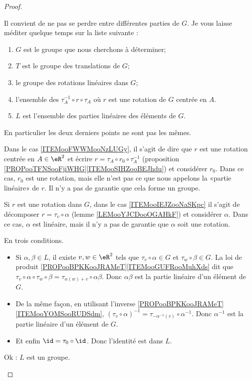 \begin{proof}
	\begin{subproof}
		Il convient de ne pas se perdre entre différentes parties de \( G\). Je vous laisse méditer quelque temps sur la liste suivante :
		\begin{enumerate}
			\item \( G\) est le groupe que nous cherchons à déterminer;
			\item \( T\) est le groupe des translations de \( G\);
			\item le groupe des rotations linéaires dans \( G\);
			\item l'ensemble des \( \tau_A^{-1}\circ r\circ\tau_A\) où \( r\) est une rotation de \( G\) centrée en \( A\).     \label{ITEMooFWWMooNzLUGy}
			\item \( L\) est l'ensemble des parties linéaires des éléments de \( G\).      \label{ITEMooIEJZooNaSKpc}
		\end{enumerate}
		En particulier les deux derniers points ne sont pas les mêmes.

		Dans le cas \ref{ITEMooFWWMooNzLUGy}, il s'agit de dire que \( r\) est une rotation centrée en \( A\in \eR^2\) et écrire \( r=\tau_A\circ r_0\circ \tau_A^{-1}\) (proposition \ref{PROPooTFNSooFjiWHG}\ref{ITEMooSIHZooBEJhdu}) et considérer \( r_0\). Dans ce cas, \( r_0\) est une rotation, mais elle n'est pas ce que nous appelons la «partie linéaire» de \( r\). Il n'y a pas de garantie que cela forme un groupe.

		Si \( r\) est une rotation dans \( G\), dans le cas \ref{ITEMooIEJZooNaSKpc} il s'agit de décomposer \( r=\tau_v\circ\alpha\) (lemme \ref{LEMooYJCDooOGAHkF}) et considérer \( \alpha\). Dans ce cas, \( \alpha\) est linéaire, mais il n'y a pas de garantie que \( \alpha\) soit une rotation.

		En trois conditions.
		\begin{itemize}
			\item
			      Si \( \alpha,\beta\in L\), il existe \( v,w\in \eR^2\) tels que \( \tau_v\circ \alpha\in G\) et \( \tau_w\circ \beta\in G\). La loi de produit \ref{PROPooBPKKooJRAMeT}\ref{ITEMooGUFRooMuhXds} dit que \( \tau_v\circ \alpha\circ\tau_w\circ \beta=\tau_{\alpha(w)+v}\circ \alpha\beta\). Donc \( \alpha\beta\) est la partie linéaire d'un élément de \( G\).
			\item
			      De la même façon, en utilisant l'inverse \ref{PROPooBPKKooJRAMeT}\ref{ITEMooYOMSooRUDSdm}, \( (\tau_v\circ\alpha)^{-1}= \tau_{-\alpha^{-1}(v)}\circ \alpha^{-1}   \). Donc \( \alpha^{-1}\) est la partie linéaire d'un élément de \( G\).
			\item
			      Et enfin \( \id=\tau_0\circ \id\). Donc l'identité est dans \( L\).
		\end{itemize}
		Ok : \( L\) est un groupe.


\end{subproof}
\end{proof}
